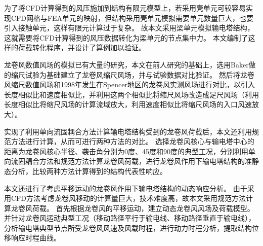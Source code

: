 为了将CFD计算得到的风压施加到结构有限元模型上，若采用壳单元可较容易实现CFD网格与FEA单元的映射，但结构采用壳单元模拟需要单元数量巨大，也要引入接触单元，这样有限元计算过于复杂。
故本文采用梁单元模拟输电塔结构，这就需要将CFD计算得到的风压数据转化为梁单元的节点集中力。
本文编制了这样的荷载转化程序，并设计了算例加以验证。

龙卷风数值风场的模拟已有大量的研究，本文在前人研究的基础上，选用Baker做的缩尺试验为基础建立了龙卷风缩尺风场，并与试验数据对比验证。
然后将龙卷风缩尺数值风场和1998年发生在Spencer地区的龙卷风实测风场进行对比，以引入长度相似比和速度相似比，并利用这两个相似比将缩尺风场改造成足尺风场（利用长度相似比将缩尺风场的计算流域放大，利用速度相似比将缩尺风场的入口风速放大）。


实现了利用单向流固耦合方法计算输电塔结构受到的龙卷风荷载后，本文还利用规范方法进行计算，从而可进行两种方法的对比。
选择龙卷风核心与输电塔中心的距离为龙卷风核心半径、袭击角分别为0度、45度和90度的典型工况，分别利用单向流固耦合方法和规范方法计算龙卷风荷载，进行龙卷风作用下输电塔结构的准静态分析，比较两种方法计算得到的结构代表性响应。


本文还进行了考虑平移运动的龙卷风作用下输电塔结构的动态响应分析。
由于采用CFD方法考虑龙卷风移动的计算量巨大，技术难度高，故本文采用规范方法计算龙卷风荷载。
首先根据龙卷风的平移运动，建立动态龙卷风风场及荷载模型。
并针对龙卷风运动典型工况（移动路径平行于输电线、移动路径垂直于输电线），分析输电塔典型节点所受龙卷风风速及风载时程，进行动力时程分析，提取结构位移响应时程曲线。




